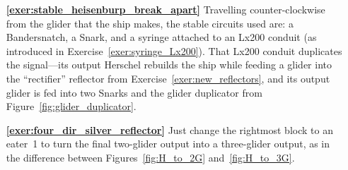 \begin{multicols}{2}
\begin{itemize}[leftmargin=0em]
%			
%			
%			
%			
		
		
		\item[\bf\color{ocre}\sffamily\ref{exer:stable_heisenburp_break_apart}] Travelling counter-clockwise from the glider that the ship makes, the stable circuits used are: a Bandersnatch, a Snark, and a syringe attached to an Lx200 conduit (as introduced in Exercise~\ref{exer:syringe_Lx200}). That Lx200 conduit duplicates the signal---its output Herschel rebuilds the ship while feeding a glider into the ``rectifier'' reflector from Exercise~\ref{exer:new_reflectors}, and its output glider is fed into two Snarks and the glider duplicator from Figure~\ref{fig:glider_duplicator}.\\
		
		
		\item[\bf\color{ocre}\sffamily\ref{exer:four_dir_silver_reflector}] Just change the rightmost block to an eater~1 to turn the final two-glider output into a three-glider output, as in the difference between Figures~\ref{fig:H_to_2G} and~\ref{fig:H_to_3G}.\\
	\end{itemize}
\end{multicols}




